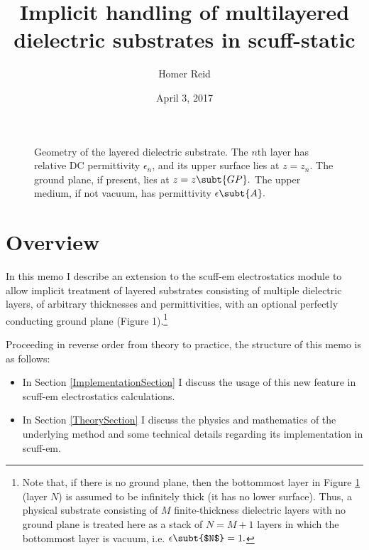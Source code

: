 \documentclass[letterpaper]{article}
\title {Implicit handling of multilayered dielectric substrates 
        in {\sc scuff-static}
       }
\author {Homer Reid}
\date {April 3, 2017}
\begin{document}
\pagestyle{myheadings}
\maketitle

\tableofcontents

\newpage
\begin{figure}
\begin{center}
\caption{Geometry of the layered dielectric substrate. The $n$th layer
has relative DC permittivity $\epsilon_n$, and its upper surface
lies at $z=z_n$. The ground plane, if present, lies
at $z=z\subt{GP}.$ The upper medium, if not vacuum, has permittivity
$\epsilon\subt{A}.$}
\label{SubstrateGeometryFigure}
\end{center}
\end{figure}
\section{Overview}

In this memo I describe an extension to the {\sc scuff-em}
electrostatics module to allow implicit treatment of
layered substrates consisting of multiple dielectric layers,
of arbitrary thicknesses and permittivities, with an optional
perfectly conducting ground plane (Figure 1).\footnote{Note 
that, if there is no ground plane, then the bottommost 
layer in Figure \ref{SubstrateGeometryFigure}
(layer $N$) is assumed
to be infinitely thick (it has no lower surface). Thus, a physical 
substrate consisting of $M$ finite-thickness dielectric layers with 
no ground plane is treated here as a stack of $N=M+1$ layers in which
the bottommost layer is vacuum, i.e. $\epsilon\subt{$N$}=1.$}

Proceeding in reverse order from theory to practice, the 
structure of this memo is as follows:

\begin{itemize}
\item 
In Section \ref{ImplementationSection} I discuss the usage
of this new feature in {\sc scuff-em} electrostatics calculations.

\item 
In Section \ref{TheorySection} I discuss the physics and
mathematics of the underlying method and some technical details
regarding its implementation in {\sc scuff-em}.
\end{itemize}
\end{document}
